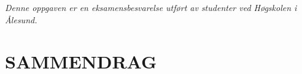 \documentclass[a4paper]{article}
\renewcommand\arraystretch{1.7}
\begin{document}
{\centering\itshape
Denne oppgaven er en eksamensbesvarelse utført av studenter ved Høgskolen i Ålesund.
\par}

\newpage



\newpage


\setcounter{tocdepth}{3}
\renewcommand\contentsname{}
\tableofcontents

\clearpage

\renewcommand{\arraystretch}{1.1}

\section*{SAMMENDRAG}



\newpage


















\end{document}
